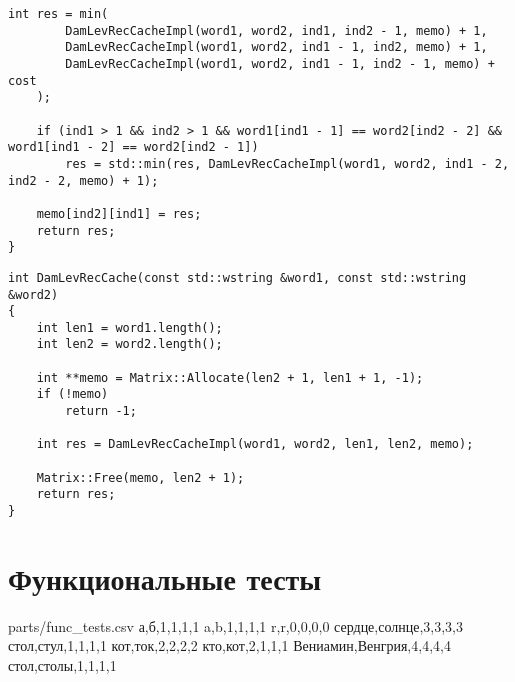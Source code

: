 \begin{lstlisting}[caption=Рекурсивный алгоритм поиска расстояния Дамерау~---~Левенштейна с кэшированием (реализация) (часть 2)]
    int res = min(
        DamLevRecCacheImpl(word1, word2, ind1, ind2 - 1, memo) + 1,
        DamLevRecCacheImpl(word1, word2, ind1 - 1, ind2, memo) + 1,
        DamLevRecCacheImpl(word1, word2, ind1 - 1, ind2 - 1, memo) + cost
    );

    if (ind1 > 1 && ind2 > 1 && word1[ind1 - 1] == word2[ind2 - 2] && word1[ind1 - 2] == word2[ind2 - 1])
        res = std::min(res, DamLevRecCacheImpl(word1, word2, ind1 - 2, ind2 - 2, memo) + 1);

    memo[ind2][ind1] = res;
    return res;
}
\end{lstlisting}

\begin{lstlisting}[caption=Рекурсивный алгоритм поиска расстояния Дамерау~---~Левенштейна с кэшированием (оберточная функция)]
int DamLevRecCache(const std::wstring &word1, const std::wstring &word2)
{
    int len1 = word1.length();
    int len2 = word2.length();

    int **memo = Matrix::Allocate(len2 + 1, len1 + 1, -1);
    if (!memo)
        return -1;

    int res = DamLevRecCacheImpl(word1, word2, len1, len2, memo);

    Matrix::Free(memo, len2 + 1);
    return res;
}
\end{lstlisting}

\section{Функциональные тесты}

\begin{filecontents*}{parts/func_tests.csv}
а,б,1,1,1,1
a,b,1,1,1,1
r,r,0,0,0,0
сердце,солнце,3,3,3,3
стол,стул,1,1,1,1
кот,ток,2,2,2,2
кто,кот,2,1,1,1
Вениамин,Венгрия,4,4,4,4
стол,столы,1,1,1,1
\end{filecontents*}

